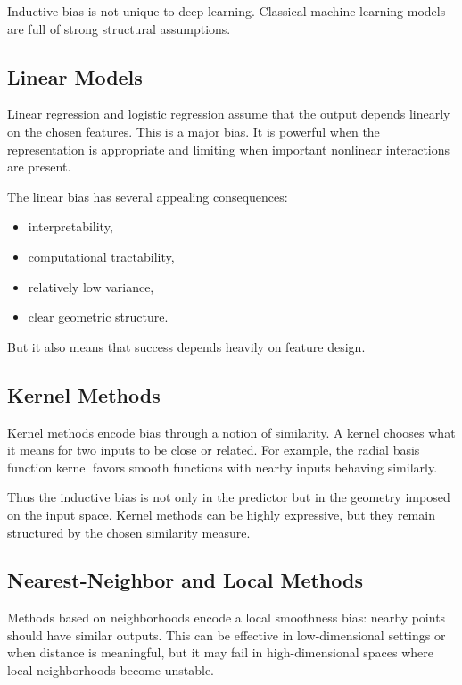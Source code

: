 Inductive bias is not unique to deep learning. Classical machine learning models are full of strong structural assumptions.

\subsection{Linear Models}

Linear regression and logistic regression assume that the output depends linearly on the chosen features. This is a major bias. It is powerful when the representation is appropriate and limiting when important nonlinear interactions are present.

The linear bias has several appealing consequences:
\begin{itemize}
    \item interpretability,
    \item computational tractability,
    \item relatively low variance,
    \item clear geometric structure.
\end{itemize}

But it also means that success depends heavily on feature design.

\subsection{Kernel Methods}

Kernel methods encode bias through a notion of similarity. A kernel chooses what it means for two inputs to be close or related. For example, the radial basis function kernel favors smooth functions with nearby inputs behaving similarly.

Thus the inductive bias is not only in the predictor but in the geometry imposed on the input space. Kernel methods can be highly expressive, but they remain structured by the chosen similarity measure.

\subsection{Nearest-Neighbor and Local Methods}

Methods based on neighborhoods encode a local smoothness bias: nearby points should have similar outputs. This can be effective in low-dimensional settings or when distance is meaningful, but it may fail in high-dimensional spaces where local neighborhoods become unstable.

